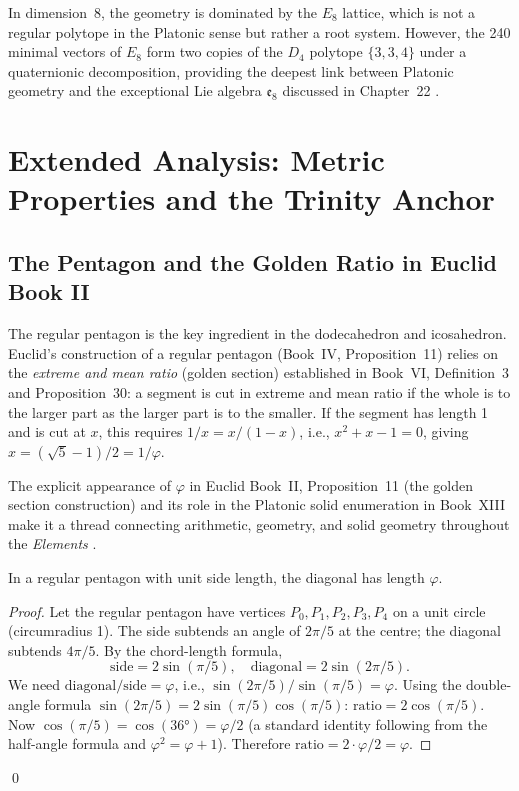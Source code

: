 In dimension~8, the geometry is dominated by the $E_8$ lattice, which is not
a regular polytope in the Platonic sense but rather a root system.  However,
the 240 minimal vectors of $E_8$ form two copies of the $D_4$ polytope
$\{3,3,4\}$ under a quaternionic decomposition, providing the deepest link
between Platonic geometry and the exceptional Lie algebra $\mathfrak{e}_8$
discussed in Chapter~22 \cite{atiyah_sutcliffe_polyhedra}.


\section{Extended Analysis: Metric Properties and the Trinity Anchor}
\label{sec:extended-analysis}

\subsection{The Pentagon and the Golden Ratio in Euclid Book II}
\label{sec:pentagon-euclid}

The regular pentagon is the key ingredient in the dodecahedron and icosahedron.
Euclid's construction of a regular pentagon (Book~IV, Proposition~11) relies
on the \emph{extreme and mean ratio} (golden section) established in Book~VI,
Definition~3 and Proposition~30: a segment is cut in extreme and mean ratio if
the whole is to the larger part as the larger part is to the smaller.  If the
segment has length 1 and is cut at $x$, this requires
$1/x = x/(1-x)$, i.e., $x^2 + x - 1 = 0$, giving $x = (\sqrt{5}-1)/2 = 1/\varphi$.

The explicit appearance of $\varphi$ in Euclid Book~II, Proposition~11 (the
golden section construction) and its role in the Platonic solid enumeration in
Book~XIII make it a thread connecting arithmetic, geometry, and solid geometry
throughout the \emph{Elements} \cite{euclid_elements}.

\begin{proposition}
\label{prop:pentagon-diagonal}
In a regular pentagon with unit side length, the diagonal has length $\varphi$.
\end{proposition}

\begin{proof}
Let the regular pentagon have vertices $P_0, P_1, P_2, P_3, P_4$ on a unit
circle (circumradius 1).  The side subtends an angle of $2\pi/5$ at the centre;
the diagonal subtends $4\pi/5$.  By the chord-length formula,
\[
  \text{side} = 2\sin(\pi/5), \quad \text{diagonal} = 2\sin(2\pi/5).
\]
We need $\text{diagonal}/\text{side} = \varphi$, i.e.,
$\sin(2\pi/5)/\sin(\pi/5) = \varphi$.  Using the double-angle formula
$\sin(2\pi/5) = 2\sin(\pi/5)\cos(\pi/5)$:
$\text{ratio} = 2\cos(\pi/5)$.
Now $\cos(\pi/5) = \cos(36°) = \varphi/2$ (a standard identity following from
the half-angle formula and $\varphi^2 = \varphi+1$).  Therefore
$\text{ratio} = 2 \cdot \varphi/2 = \varphi$.
\end{proof}
\qed

